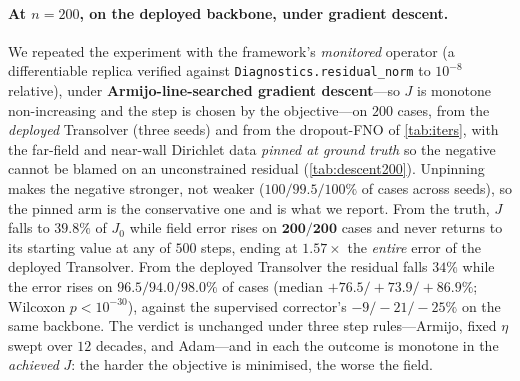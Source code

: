 \paragraph{At $n=200$, on the deployed backbone, under gradient descent.} We repeated
the experiment with the framework's \emph{monitored} operator (a differentiable replica
verified against \texttt{Diagnostics.residual\_norm} to $10^{-8}$ relative), under
\textbf{Armijo-line-searched gradient descent}---so $J$ is monotone non-increasing and
the step is chosen by the objective---on $200$ cases, from the \emph{deployed}
Transolver (three seeds) and from the dropout-FNO of \autoref{tab:iters}, with the
far-field and near-wall Dirichlet data \emph{pinned at ground truth} so the negative
cannot be blamed on an unconstrained residual (\autoref{tab:descent200}). Unpinning
makes the negative stronger, not weaker ($100/99.5/100\%$ of cases across seeds), so the
pinned arm is the conservative one and is what we report. From the truth, $J$ falls to
$39.8\%$ of $J_0$ while field error rises on $\mathbf{200/200}$ cases and never returns
to its starting value at any of $500$ steps, ending at $1.57\times$ the \emph{entire}
error of the deployed Transolver. From the deployed Transolver the residual falls $34\%$
while the error rises on $\mathbf{96.5/94.0/98.0\%}$ of cases (median
$+76.5/+73.9/+86.9\%$; Wilcoxon $p<10^{-30}$), against the supervised corrector's
$-9/-21/-25\%$ on the same backbone. The verdict is unchanged under three step
rules---Armijo, fixed $\eta$ swept over $12$ decades, and Adam---and in each the outcome
is monotone in the \emph{achieved} $J$: the harder the objective is minimised, the worse
the field.

